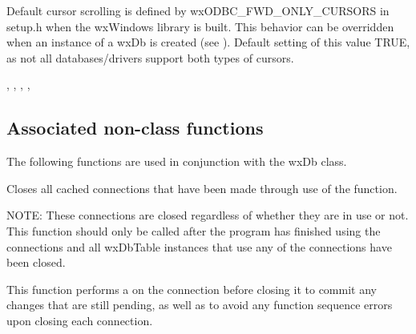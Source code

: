 



Default cursor scrolling is defined by wxODBC\_FWD\_ONLY\_CURSORS in setup.h
when the wxWindows library is built.  This behavior can be overridden when 
an instance of a wxDb is created (see ).  
Default setting of this value TRUE, as not all databases/drivers support 
both types of cursors.


, , 
, , 

\subsection{Associated non-class functions}\label{wxdbfunctions}

The following functions are used in conjunction with the wxDb class.




Closes all cached connections that have been made through use of the 
 function.  

NOTE: These connections are closed regardless of whether they are in use 
or not.  This function should only be called after the program has 
finished using the connections and all wxDbTable instances that use any of 
the connections have been closed.

This function performs a  
on the connection before closing it to commit any changes that are still 
pending, as well as to avoid any function sequence errors upon closing 
each connection.


